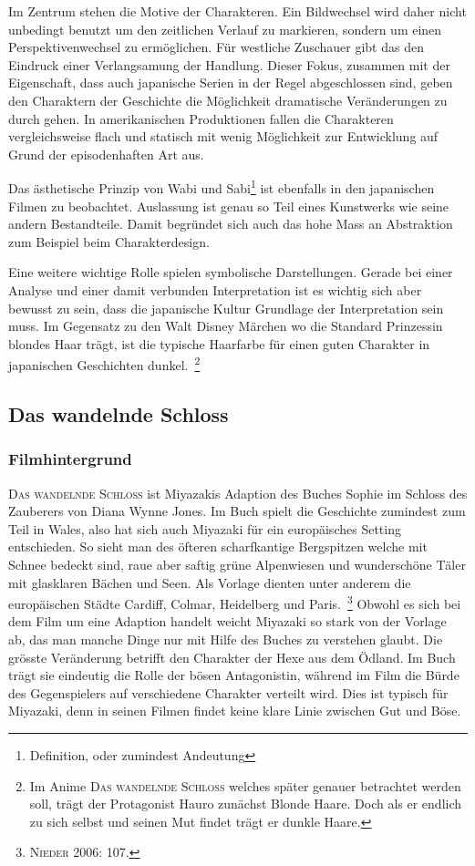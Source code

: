 Im Zentrum stehen die Motive der Charakteren. Ein Bildwechsel wird daher nicht unbedingt benutzt um den zeitlichen Verlauf zu markieren, sondern um einen Perspektivenwechsel zu ermöglichen. Für westliche Zuschauer gibt das den Eindruck einer Verlangsamung der Handlung. Dieser Fokus, zusammen mit der Eigenschaft, dass auch japanische Serien in der Regel abgeschlossen sind, geben den Charaktern der Geschichte die Möglichkeit dramatische Veränderungen zu durch gehen. In amerikanischen Produktionen fallen die Charakteren vergleichsweise flach und statisch mit wenig Möglichkeit zur Entwicklung auf Grund der episodenhaften Art aus.

Das ästhetische Prinzip von Wabi und Sabi\footnote{Definition, oder zumindest Andeutung} ist ebenfalls in den japanischen Filmen zu beobachtet. Auslassung ist genau so Teil eines Kunstwerks wie seine andern Bestandteile. Damit begründet sich auch das hohe Mass an Abstraktion zum Beispiel beim Charakterdesign.  

Eine weitere wichtige Rolle spielen symbolische Darstellungen. Gerade bei einer Analyse und einer damit verbunden Interpretation ist es wichtig sich aber bewusst zu sein, dass die japanische Kultur Grundlage der Interpretation sein muss. Im Gegensatz zu den Walt Disney Märchen wo die Standard Prinzessin blondes Haar trägt, ist die typische Haarfarbe für einen guten Charakter in japanischen Geschichten dunkel.~\footnote{Im Anime \textsc{Das wandelnde Schloss} welches später genauer betrachtet werden soll, trägt der Protagonist Hauro zunächst Blonde Haare. Doch als er endlich zu sich selbst und seinen Mut findet trägt er dunkle Haare.} 

\subsection{Das wandelnde Schloss}

\subsubsection{Filmhintergrund}
\textsc{Das wandelnde Schloss} ist Miyazakis Adaption des Buches \glqq Sophie im Schloss des Zauberers \grqq von Diana Wynne Jones. Im Buch spielt die Geschichte zumindest zum Teil in Wales, also hat sich auch Miyazaki für ein europäisches Setting entschieden. So sieht man des öfteren scharfkantige Bergspitzen welche mit Schnee bedeckt sind, raue aber saftig grüne Alpenwiesen und wunderschöne Täler mit glasklaren Bächen und Seen. Als Vorlage dienten unter anderem die europäischen Städte Cardiff, Colmar, Heidelberg und Paris.~\footnote{\textsc{Nieder} 2006: 107.} Obwohl es sich bei dem Film um eine Adaption handelt weicht Miyazaki so stark von der Vorlage ab, das man manche Dinge nur mit Hilfe des Buches zu verstehen glaubt. Die grösste Veränderung betrifft den Charakter der Hexe aus dem Ödland. Im Buch trägt sie eindeutig die Rolle der bösen Antagonistin, während im Film die Bürde des Gegenspielers auf verschiedene Charakter verteilt wird. Dies ist typisch für Miyazaki, denn in seinen Filmen findet keine klare Linie zwischen Gut und Böse. 

